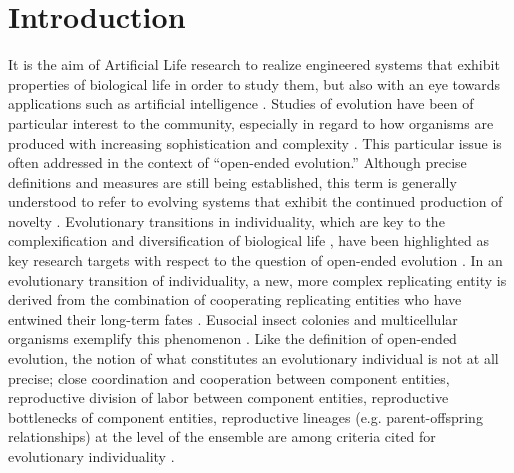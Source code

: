 \section{Introduction}

It is the aim of Artificial Life research to realize engineered systems that exhibit properties of biological life in order to study them, but also with an eye towards applications such as artificial intelligence \citep{bedau2003artificial}.
Studies of evolution have been of particular interest to the community, especially in regard to how organisms are produced with increasing sophistication and complexity \citep{goldsby2017increasing}.
This particular issue is often addressed in the context of ``open-ended evolution.''
Although precise definitions and measures are still being established, this term is generally understood to refer to evolving systems that exhibit the continued production of novelty \citep{taylor2016open}.
Evolutionary transitions in individuality, which are key to the complexification and diversification of biological life \citep{smith1997major}, have been highlighted as key research targets with respect to the question of open-ended evolution \citep{ray1996evolving, banzhaf2016defining}.
In an evolutionary transition of individuality, a new, more complex replicating entity is derived from the combination of cooperating replicating entities who have entwined their long-term fates \citep{west2015major}.
Eusocial insect colonies and multicellular organisms exemplify this phenomenon \cite{smith1997major}.
Like the definition of open-ended evolution, the notion of what constitutes an evolutionary individual is not %
at all precise;
 close coordination and cooperation between component entities, reproductive division of labor between component entities, reproductive bottlenecks of component entities, reproductive lineages (e.g. parent-offspring relationships) at the level of the ensemble are among criteria cited for evolutionary individuality
\citep{ereshefsky2015rethinking, bouchard2013symbiotic}.


